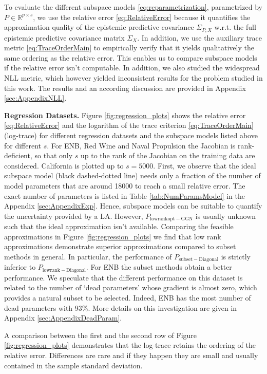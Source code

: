 To evaluate the different subspace models \eqref{eq:reparametrization}, parametrized by $P\in \mathbb{R}^{p\times s}$, we use the relative error \eqref{eq:RelativeError} because it quantifies the approximation quality of the epistemic predictive covariance $\Sigma_{P,X}$ w.r.t. the full epistemic predictive covariance matrix $\Sigma_X$. In addition, we use the auxiliary trace metric \eqref{eq:TraceOrderMain} to empirically verify that it yields qualitatively the same ordering as the relative error. This enables us to compare subspace models if the relative error isn't computable. In addition, we also studied the widespread NLL metric, which however yielded inconsistent results for the problem studied in this work. The results and an according discussion are provided in Appendix \ref{sec:AppendixNLL}.


\textbf{Regression Datasets.} Figure \ref{fig:regression_plots} shows the relative error \eqref{eq:RelativeError} and the logarithm of the trace criterion \eqref{eq:TraceOrderMain} (log-trace) for different regression datasets and the subspace models listed above for different $s$. For ENB, Red Wine and Naval Propulsion the Jacobian is rank-deficient, so that only $s$ up to the rank of the Jacobian on the training data are considered. California is plotted up to $s=5000$. First, we observe that the ideal subspace model (black dashed-dotted line) needs only a fraction of the number of model parameters that are around 18000 to reach a small relative error. The exact number of parameters is listed in Table \ref{tab:NumParamsModel} in the Appendix \ref{sec:AppendixExp}. Hence, subspace models can be suitable to quantify the uncertainty provided by a LA. However, $P_{\mathrm{lowrankopt-GGN}}$ is usually unknown such that the ideal approximation isn't available. 
Comparing the feasible approximations in Figure \ref{fig:regression_plots} we find that low rank approximations demonstrate superior approximations compared to subset methods in general. In particular, the performance of $P_{\mathrm{subset-Diagonal}}$ is strictly inferior to $P_{\mathrm{lowrank-Diagonal}}$. For ENB the subset methods obtain a better performance. We speculate that the different performance on this dataset is related to the number of `dead parameters' whose gradient is almost zero, which provides a natural subset to be selected. Indeed, ENB has the most number of dead parameters with 93\%. More details on this investigation are given in Appendix \ref{sec:AppendixDeadParam}.

A comparison between the first and the second row of Figure \ref{fig:regression_plots} demonstrates that the log-trace retains the ordering of the relative error. Differences are rare and if they happen they are small and usually contained in the sample standard deviation.


